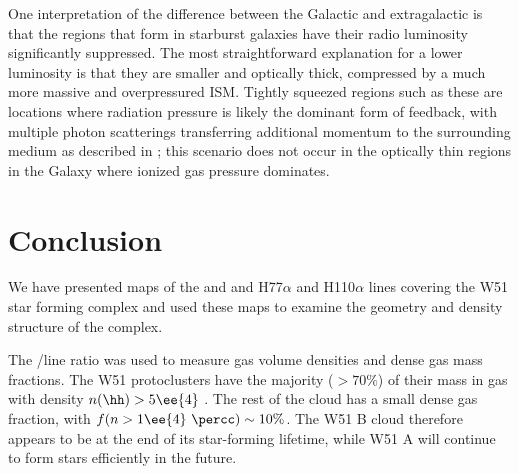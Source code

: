 One interpretation of the difference between the Galactic and
extragalactic \formaldehyde is that the \hii regions that form in starburst
galaxies have their radio luminosity significantly suppressed.  The most
straightforward explanation for a lower luminosity is that they are smaller and
optically thick, compressed by a much more massive and overpressured
ISM.  Tightly squeezed \hii regions such as these are locations where radiation
pressure is likely the dominant form of feedback, with multiple photon
scatterings transferring additional momentum to the surrounding medium as
described in \citet{Murray2010b}; this scenario does not occur in the optically
thin \hii regions in the Galaxy where ionized gas pressure dominates.


\section{Conclusion}
\label{sec:conclusion}
We have presented maps of the \formaldehyde \oneone and \twotwo and H77$\alpha$
and H110$\alpha$ lines covering the W51 star forming complex and used these maps
to examine the geometry and density structure of the complex.  





The \formaldehyde \oneone/\twotwo line ratio was used to measure gas volume
densities and dense gas mass fractions.  The W51 protoclusters have the majority
($>70\%$) of their mass in gas with density $n(\hh)>5\ee{4}$ \percc.  The rest of
the cloud has a small dense gas fraction, with $f(n>1\ee{4}~\percc) \sim 10\%$.
The W51 B cloud therefore appears to be at the end of its star-forming
lifetime, while W51 A will continue to form stars efficiently in the
future.  

